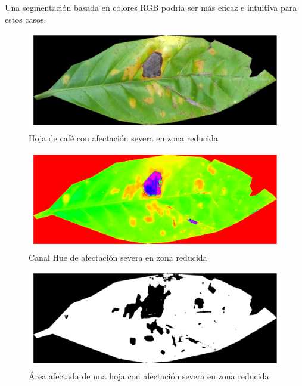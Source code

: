 \begin{enumerate}
Una segmentación basada en colores \textsf{RGB} podría ser más eficaz e intuitiva para estos casos.

\begin{figure}[H]
\centering
\includegraphics[scale=1]{images/consideration_severity_rgb.png}
\caption{Hoja de café con afectación severa en zona reducida}
\label{img:issue_severity_rgb}
\end{figure}

\begin{figure}[H]
\centering
\includegraphics[scale=1]{images/consideration_severity_hue.png}
\caption{Canal Hue de afectación severa en zona reducida}
\label{img:issue_severity_hue}
\end{figure}

\begin{figure}[H]
\centering
\includegraphics[scale=1]{images/consideration_severity_binary.png}
\caption{Área afectada de una hoja con afectación severa en zona reducida}
\label{img:issue_severity_binary}
\end{figure}

\end{enumerate}